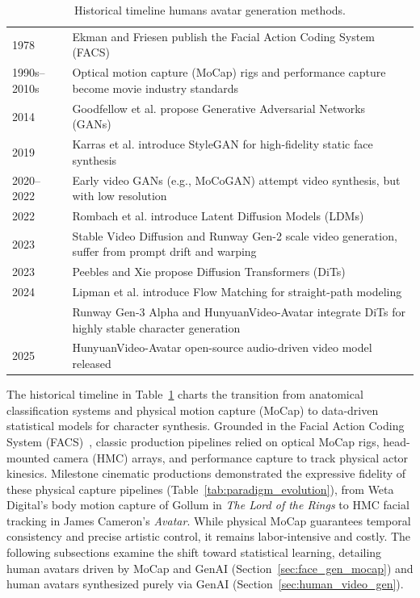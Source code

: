 \documentclass[pdflatex,sn-mathphys-num]{sn-jnl}
\newcommand{\foo}{\hspace{1em}}
\theoremstyle{thmstyleone}
\theoremstyle{thmstyletwo}
\theoremstyle{thmstylethree}
\begin{document}
\begin{table}[ht!]
\caption{Historical timeline humans avatar generation methods.}\label{tab:evolution_timeline}
\begin{tabular}{l | @{\foo} p{10.5cm}}
    1978 & Ekman and Friesen publish the Facial Action Coding System (FACS)~\cite{ekman1978facial} \\
    1990s--2010s & Optical motion capture (MoCap) rigs and performance capture become movie industry standards \\
    2014 & Goodfellow et al. propose Generative Adversarial Networks (GANs)~\cite{goodfellow2014generative} \\
    2019 & Karras et al. introduce StyleGAN for high-fidelity static face synthesis~\cite{karras2019style} \\
    2020--2022 & Early video GANs (e.g., MoCoGAN) attempt video synthesis, but with low resolution  \\
    2022 & Rombach et al. introduce Latent Diffusion Models (LDMs)~\cite{rombach2022high} \\
    2023 & Stable Video Diffusion and Runway Gen-2 scale video generation, suffer from prompt drift and warping \\
    2023 & Peebles and Xie propose Diffusion Transformers (DiTs)~\cite{peebles2023scalable} \\
    2024 & Lipman et al. introduce Flow Matching for straight-path modeling~\cite{lipman2022flow} \\
         & Runway Gen-3 Alpha and HunyuanVideo-Avatar integrate DiTs for highly stable character generation~\cite{hunyuan2025avatar,runway2024gen3} \\
    2025 & HunyuanVideo-Avatar open-source audio-driven video model released~\cite{hunyuan2025avatar} \\
\end{tabular}
\end{table}

The historical timeline in Table~\ref{tab:evolution_timeline} charts the transition from anatomical classification systems and physical motion capture (MoCap) to data-driven statistical models for character synthesis. Grounded in the Facial Action Coding System (FACS)~\cite{ekman1978facial}, classic production pipelines relied on optical MoCap rigs, head-mounted camera (HMC) arrays, and performance capture to track physical actor kinesics. Milestone cinematic productions demonstrated the expressive fidelity of these physical capture pipelines (Table~\ref{tab:paradigm_evolution}), from Weta Digital's body motion capture of Gollum in \textit{The Lord of the Rings} to HMC facial tracking in James Cameron's \textit{Avatar}. While physical MoCap guarantees temporal consistency and precise artistic control, it remains labor-intensive and costly. The following subsections examine the shift toward statistical learning, detailing human avatars driven by MoCap and GenAI (Section~\ref{sec:face_gen_mocap}) and human avatars synthesized purely via GenAI (Section~\ref{sec:human_video_gen}).
\end{document}
